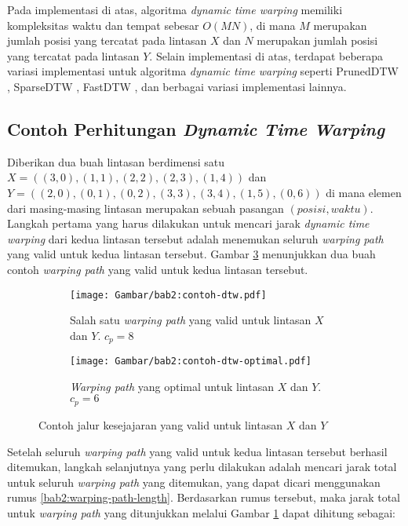 Pada implementasi di atas, algoritma \textit{dynamic time warping} memiliki kompleksitas waktu dan tempat sebesar $O(MN)$, di mana $M$ merupakan jumlah posisi yang tercatat pada lintasan $X$ dan $N$ merupakan jumlah posisi yang tercatat pada lintasan $Y$. Selain implementasi di atas, terdapat beberapa variasi implementasi untuk algoritma \textit{dynamic time warping} seperti PrunedDTW \cite{diego:02:pruned-dtw}, SparseDTW \cite{ghazi:02:sparse-dtw}, FastDTW \cite{salvador:02:fast-dtw}, dan berbagai variasi implementasi lainnya.

\subsection{Contoh Perhitungan \textit{Dynamic Time Warping}}
\label{subsec:contoh-dtw}

Diberikan dua buah lintasan berdimensi satu $X = ((3, 0), (1, 1), (2, 2), (2, 3), (1, 4))$ dan $Y = ((2, 0), (0, 1), (0, 2), (3, 3), (3, 4), (1, 5), (0, 6))$ di mana elemen dari masing-masing lintasan merupakan sebuah pasangan $(posisi, waktu)$. Langkah pertama yang harus dilakukan untuk mencari jarak \textit{dynamic time warping} dari kedua lintasan tersebut adalah menemukan seluruh \textit{warping path} yang valid untuk kedua lintasan tersebut. Gambar \ref{bab2:contoh-dtw} menunjukkan dua buah contoh \textit{warping path} yang valid untuk kedua lintasan tersebut.

\begin{figure}[h]
    \centering
    \begin{subfigure}{0.25\textwidth}
        \centering
        \texttt{[image: Gambar/bab2:contoh-dtw.pdf]}
        \caption{Salah satu \textit{warping path} yang valid untuk lintasan $X$ dan $Y$. $c_p = 8$}
        \label{bab2:warping-path}
    \end{subfigure} \hspace{1cm}
    \begin{subfigure}{0.25\textwidth}
        \centering
        \texttt{[image: Gambar/bab2:contoh-dtw-optimal.pdf]}
        \caption{\textit{Warping path} yang optimal untuk lintasan $X$ dan $Y$. $c_p = 6$}
        \label{bab2:warping-path-optimal}
    \end{subfigure}
    \caption{Contoh jalur kesejajaran yang valid untuk lintasan $X$ dan $Y$}
    \label{bab2:contoh-dtw}
\end{figure}

Setelah seluruh \textit{warping path} yang valid untuk kedua lintasan tersebut berhasil ditemukan, langkah selanjutnya yang perlu dilakukan adalah mencari jarak total untuk seluruh \textit{warping path} yang ditemukan, yang dapat dicari menggunakan rumus \ref{bab2:warping-path-length}. Berdasarkan rumus tersebut, maka jarak total untuk \textit{warping path} yang ditunjukkan melalui Gambar \ref{bab2:warping-path} dapat dihitung sebagai:

